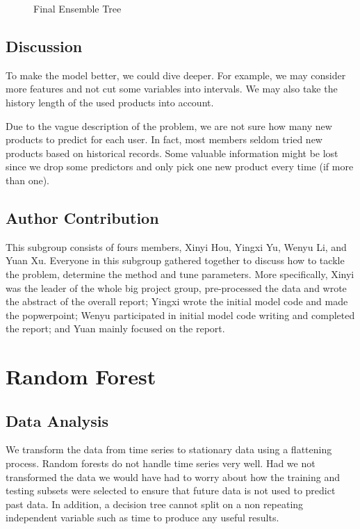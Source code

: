 \documentclass{article}
\begin{document}
\begin{spacing}{1}
\begin{large}
\begin{figure}[H]
\caption{Final Ensemble Tree}
\end{figure}
\newpage


\subsection{Discussion}

To make the model better, we could dive deeper. For example, we may consider more features and not cut some variables into intervals. We may also take the history length of the used products into account.

Due to the vague description of the problem, we are not sure how many new products to predict for each user. In fact, most members seldom tried new products based on historical records. Some valuable information might be lost since we drop some predictors and only pick one new product every time (if more than one).


\subsection{Author Contribution}

This subgroup consists of fours members, Xinyi Hou, Yingxi Yu, Wenyu Li, and Yuan Xu. Everyone in this subgroup gathered together to discuss how to tackle the problem, determine the method and tune parameters. More specifically, Xinyi was the leader of the whole big project group, pre-processed the data and wrote the abstract of the overall report; Yingxi wrote the initial model code and made the popwerpoint; Wenyu participated in initial model code writing and completed the report; and Yuan mainly focused on the report.

\section{Random Forest}

\subsection{Data Analysis}

We transform the data from time series to stationary data using a flattening process. Random forests do not handle time series very well. Had we not transformed the data we would have had to worry about how the training and testing subsets were selected to ensure that future data is not used to predict past data. In addition, a decision tree cannot split on a non repeating independent variable such as time to produce any useful results.


\end{large}
\end{spacing}
\end{document}
